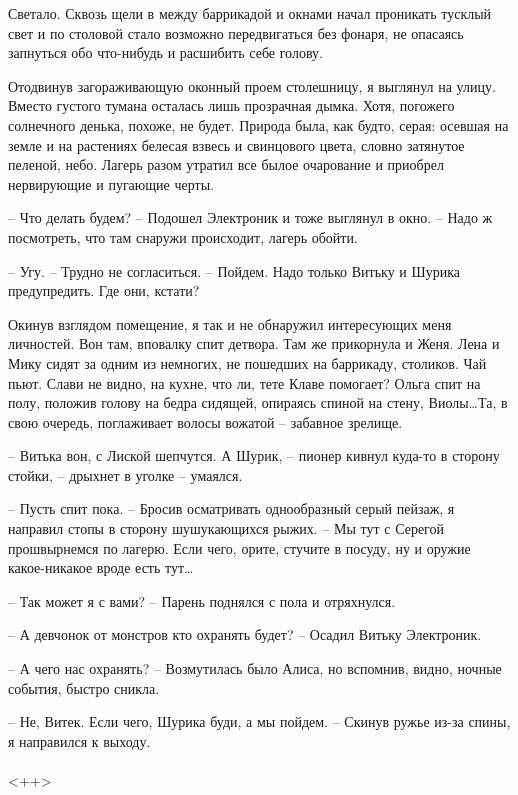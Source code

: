 \documentclass[a4paper]{book}
\begin{document}
Светало. Сквозь щели в между баррикадой и окнами начал проникать тусклый свет и по столовой стало возможно передвигаться без фонаря, не опасаясь запнуться обо что-нибудь и расшибить себе голову.

Отодвинув загораживающую оконный проем столешницу, я выглянул на улицу. Вместо густого тумана осталась лишь прозрачная дымка. Хотя, погожего солнечного денька, похоже, не будет. Природа была, как будто, серая: осевшая на земле и на растениях белесая взвесь и свинцового цвета, словно затянутое пеленой, небо. Лагерь разом утратил все былое очарование и приобрел нервирующие и пугающие черты. 

-- Что делать будем? -- Подошел Электроник и тоже выглянул в окно. -- Надо ж посмотреть, что там снаружи происходит, лагерь обойти.

-- Угу. -- Трудно не согласиться. -- Пойдем. Надо только Витьку и Шурика предупредить. Где они, кстати?

Окинув взглядом помещение, я так и не обнаружил интересующих меня личностей. Вон там, вповалку спит детвора. Там же прикорнула и Женя. Лена и Мику сидят за одним из немногих, не пошедших на баррикаду, столиков. Чай пьют. Слави не видно, на кухне, что ли, тете Клаве помогает? Ольга спит на полу, положив голову на бедра сидящей, опираясь спиной на стену, Виолы\ldots Та, в свою очередь, поглаживает волосы вожатой -- забавное зрелище.

-- Витька вон, с Лиской шепчутся. А Шурик, -- пионер кивнул куда-то в сторону стойки, -- дрыхнет в уголке -- умаялся. 

-- Пусть спит пока. -- Бросив осматривать однообразный серый пейзаж, я направил стопы в сторону шушукающихся рыжих. -- Мы тут с Серегой прошвырнемся по лагерю. Если чего, орите, стучите в посуду, ну и оружие какое-никакое вроде есть тут\ldots

-- Так может я с вами? -- Парень поднялся с пола и отряхнулся.

-- А девчонок от монстров кто охранять будет? -- Осадил Витьку Электроник.

-- А чего нас охранять? -- Возмутилась было Алиса, но вспомнив, видно, ночные события, быстро сникла. 

-- Не, Витек. Если чего, Шурика буди, а мы пойдем. -- Скинув ружье из-за спины, я направился к выходу. 

\paragraph{}<++>
\end{document}
